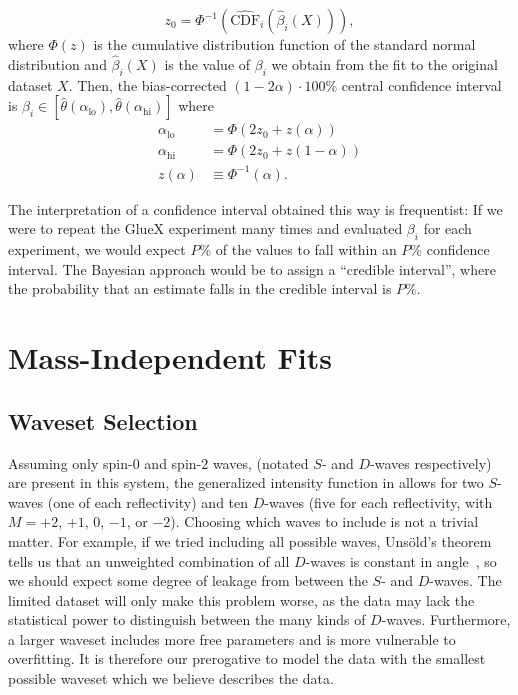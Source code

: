 \begin{equation}
  z_0 = \Phi^{-1}\left(\hat{\text{CDF}}_i(\hat{\beta}_i(X))\right),
\end{equation}
where $\Phi(z)$ is the cumulative distribution function of the standard normal distribution and $\hat{\beta}_i(X)$ is the value of $\beta_i$ we obtain from the fit to the original dataset $X$. Then, the bias-corrected $(1-2\alpha)\cdot 100\%$ central confidence interval is $\beta_i \in \left[\hat{\theta}(\alpha_\text{lo}),\hat{\theta}(\alpha_\text{hi})\right]$ where
\begin{align}
  \alpha_\text{lo} &= \Phi\left(2z_0 + z(\alpha)\right) \\
  \alpha_\text{hi} &= \Phi\left(2z_0 + z(1-\alpha)\right) \\
  z(\alpha) &\equiv \Phi^{-1}(\alpha).
\end{align}

The interpretation of a confidence interval obtained this way is frequentist: If we were to repeat the GlueX experiment many times and evaluated $\beta_i$ for each experiment, we would expect $P\%$ of the values to fall within an $P\%$ confidence interval. The Bayesian approach would be to assign a ``credible interval'', where the probability that an estimate falls in the credible interval is $P\%$.

\section{Mass-Independent Fits}\label{sec:mass-independent-fits}

\subsection{Waveset Selection}

Assuming only spin-$0$ and spin-$2$ waves, (notated $S$- and $D$-waves respectively) are present in this system, the generalized intensity function in  allows for two $S$-waves (one of each reflectivity) and ten $D$-waves (five for each reflectivity, with $M=+2$, $+1$, $0$, $-1$, or $-2$). Choosing which waves to include is not a trivial matter. For example, if we tried including all possible waves, Uns\"old's theorem tells us that an unweighted combination of all $D$-waves is constant in angle~\cite{Unsld1927}, so we should expect some degree of leakage from between the $S$- and $D$-waves. The limited dataset will only make this problem worse, as the data may lack the statistical power to distinguish between the many kinds of $D$-waves. Furthermore, a larger waveset includes more free parameters and is more vulnerable to overfitting. It is therefore our prerogative to model the data with the smallest possible waveset which we believe describes the data.

